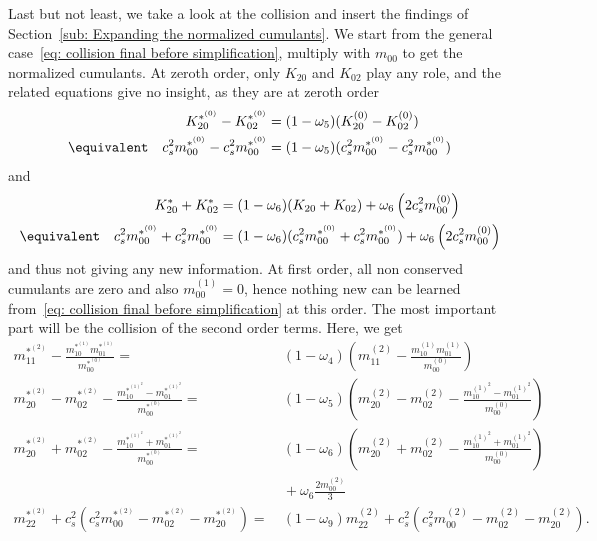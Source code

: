 Last but not least, we take a look at the collision and insert the findings of Section~\ref{sub: Expanding the normalized cumulants}.
We start from the general case~\eqref{eq: collision final before simplification}, multiply with $m_{00}$ to get the normalized cumulants.
At zeroth order, only $K_{20}$ and $K_{02}$ play any role, and the related equations give no insight, as they are at zeroth order
\begin{equation}
  \begin{aligned}
    &&K_{20}^{*^{(0)}} - K_{02}^{*^{(0)}}
      & = (1-\omega_5) (K_{20}^{(0)} - K_{02}^{(0)}) \\
    &\equivalent& c_s^2 m_{00}^{*^{(0)}} - c_s^2 m_{00}^{*^{(0)}}
        & = (1-\omega_5) (c_s^2 m_{00}^{*^{(0)}} - c_s^2 m_{00}^{*^{(0)}})
  \end{aligned}
\end{equation}
and
\begin{equation}
  \begin{aligned}
    &&K_{20}^{*} + K_{02}^{*}
      & = (1-\omega_6)(K_{20} + K_{02}) + \omega_6 \left( 2 c_s^2 m_{00}^{(0)} \right) \\
    &\equivalent& c_s^2 m_{00}^{*^{(0)}} + c_s^2 m_{00}^{*^{(0)}}
      & = (1-\omega_6)(c_s^2 m_{00}^{*^{(0)}} + c_s^2 m_{00}^{*^{(0)}}) + \omega_6 \left( 2 c_s^2 m_{00}^{(0)} \right) \\
  \end{aligned}
\end{equation}
and thus not giving any new information.
At first order, all non conserved cumulants are zero and also $m_{00}^{(1)}=0$, hence nothing new can be learned from~\eqref{eq: collision final before simplification} at this order.
The most important part will be the collision of the second order terms.
Here, we get
\begin{align}
  \label{eq: collide moments 11_2 raw}
  m_{11}^{*^{(2)}} - \frac{ m_{10}^{*^{(1)}}m_{01}^{*^{(1)}}}{m_{00}^{*^{(0)}}} =&\ (1-\omega_4)\left(m_{11}^{(2)} - \frac{ m_{10}^{(1)}m_{01}^{(1)}}{m_{00}^{(0)}}\right)
  \\
  \label{eq: collide moments 20m02_2 raw}
  m_{20}^{*^{(2)}}-m_{02}^{*^{(2)}} - \frac{ m_{10}^{*^{{(1)}^2}} - m_{01}^{*^{{(1)}^2}}}{m_{00}^{*^{(0)}}} =&\ (1-\omega_5) \left(m_{20}^{(2)}-m_{02}^{(2)} - \frac{ m_{10}^{{(1)}^2} - m_{01}^{{(1)}^2}}{m_{00}^{(0)}}\right)
  \\
  \label{eq: collide moments 20p02_2 raw}
  m_{20}^{*^{(2)}}+m_{02}^{*^{(2)}} - \frac{ m_{10}^{*^{{(1)}^2}} + m_{01}^{*^{{(1)}^2}}}{m_{00}^{*^{(0)}}}
  =&\ (1-\omega_6)\left(  m_{20}^{(2)}+m_{02}^{(2)} - \frac{ m_{10}^{{(1)}^2} + m_{01}^{{(1)}^2}}{m_{00}^{(0)}}\right)
  \\\nonumber&\ + \omega_6\frac{2 m_{00}^{(2)}}{3}
  \\
  \label{eq: collide moments 22_2 raw}
  m_{22}^{*^{(2)}}
  + c_s^2\left(c_s^2 m_{00}^{*^{(2)}}
  - m_{02}^{*^{(2)}}
  - m_{20}^{*^{(2)}} \right)
  =&\ (1-\omega_9)m_{22}^{(2)}
  + c_s^2\left(c_s^2 m_{00}^{(2)}
  - m_{02}^{(2)}
  - m_{20}^{(2)}    \right).
\end{align}
